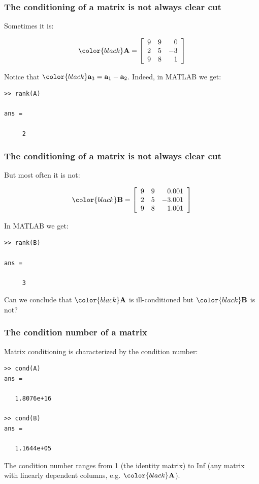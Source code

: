 \documentclass[compress]{beamer}
\newcommand{\black}[1]{{\color{black}#1}}
\newcommand{\beq}[1]{\[\black{#1}\]}
\begin{document}
\begin{frame}[fragile]
\frametitle{The conditioning of a matrix is not always clear cut}

Sometimes it is:

\beq{
\A = 
\left[
	\begin{array}{rrr}
	9 & 9 & 0\\
	2 & 5 & -3\\
	9 & 8 & 1\\
	\end{array}
\right]
}

Notice that $\black{\a_3=\a_1-\a_2}$. Indeed, in MATLAB we get:

\begin{verbatim}
>> rank(A)

ans =

     2
\end{verbatim}

\end{frame}


\begin{frame}[fragile]
\frametitle{The conditioning of a matrix is not always clear cut}

But most often it is not:

\beq{
\B = 
\left[
	\begin{array}{rrr}
	9 & 9 & 0.001\\
	2 & 5 & -3.001\\
	9 & 8 & 1.001\\
	\end{array}
\right]
}

In MATLAB we get:

\begin{verbatim}
>> rank(B)

ans =

     3
\end{verbatim}

Can we conclude that $\black{\A}$  is ill-conditioned but $\black{\B}$ is not?


\end{frame}


\begin{frame}[fragile]
\frametitle{The condition number of a matrix}

Matrix conditioning is characterized by the condition number:

\color{black}
\begin{verbatim}
>> cond(A)
ans =

   1.8076e+16
   
>> cond(B)
ans =

   1.1644e+05
\end{verbatim}

\color{gray}

The condition number ranges from \black{1} (the identity matrix) to \black{Inf} (any matrix with linearly dependent columns, e.g. $\black{\A}$).
\end{frame}
\end{document}
